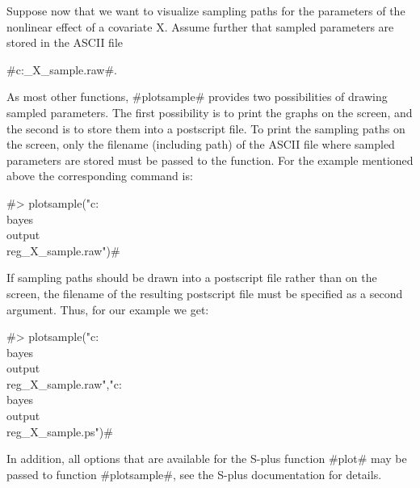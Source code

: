 Suppose now that we want to visualize sampling paths for the
parameters of the nonlinear effect of a covariate X. Assume
further that sampled parameters are stored in the ASCII file

#c:\bayes\output\reg_X_sample.raw#.

As most other functions, #plotsample# provides two possibilities
of drawing sampled parameters. The first possibility is to print
the graphs on the screen, and the second is to store them into a
postscript file. To print the sampling paths on the screen, only
the filename (including path) of the ASCII file where sampled
parameters are stored must be passed to the function. For the
example mentioned above the corresponding command is:

#> plotsample("c:\\bayes\\output\\reg_X_sample.raw")#

If sampling paths should be drawn into a postscript file rather
than on the screen, the filename of the resulting postscript file
must be specified as a second argument. Thus, for our example we
get:

 #> plotsample("c:\\bayes\\output\\reg_X_sample.raw","c:\\bayes\\output\\reg_X_sample.ps")#

In addition, all options that are available for the S-plus
function #plot# may be passed to function #plotsample#, see the
S-plus documentation for details.
